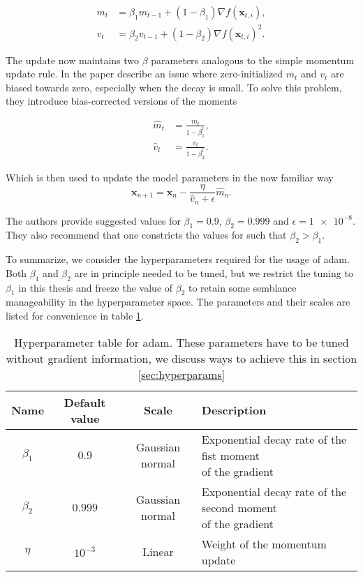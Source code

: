 \begin{align}
m_t &= \beta_1 m_{t-1} +(1-\beta_1)\nabla f(\mathbf{x}_{t, i}), \\
v_t &= \beta_2 v_{t-1} +(1-\beta_2)\nabla f(\mathbf{x}_{t, i})^2.
\end{align}

\noindent The update now maintains two $\beta$ parameters analogous to the simple momentum update rule. In the paper \citet{Kingma2015} describe an issue where zero-initialized $m_t$ and $v_t$ are biased towards zero, especially when the decay is small. To solve this problem, they introduce bias-corrected versions of the moments 

\begin{align}
\hat{m}_t &= \frac{m_t}{1 - \beta_1^t}, \\
\hat{v}_t &= \frac{v_t}{1 - \beta_2^t}.
\end{align}

\noindent Which is then used to update the model parameters in the now familiar way
\begin{equation}\label{eq:adam}
\mathbf{x}_{n+1} = \mathbf{x}_{n} - \frac{\eta}{\hat{v}_n + \epsilon}\hat{m}_n.
\end{equation}

\noindent The authors provide suggested values for $\beta_1 =0.9 $, $\beta_2 =0.999$ and $\epsilon = \num{1e-8}$. They also recommend that one constricts the values for such that $\beta_2 > \beta_1$. 

To summarize, we consider the hyperparameters required for the usage of adam. Both $\beta_1$ and $\beta_2$ are in principle needed to be tuned, but we restrict the tuning to $\beta_1$ in this thesis and freeze the value of $\beta_2$ to retain some semblance manageability in the hyperparameter space. The parameters and their scales are listed for convenience in table \ref{tab:adam}.

\begin{table}
\begin{tabular}{cccl}
\toprule
Name &Default value & Scale  & Description\\
\midrule
$\beta_1$  & $0.9$ & Gaussian normal & \makecell[l]{Exponential decay rate of the fist moment \\ of the gradient}\\
$\beta_2$  & $0.999$ & Gaussian normal & \makecell[l]{Exponential decay rate of the second moment \\ of the gradient}\\
$\eta$  & $10^{-3}$ & Linear & Weight of the momentum update \\
\bottomrule
\end{tabular}
\caption{Hyperparameter table for adam. These parameters have to be tuned without gradient information, we discuss ways to achieve this in section \ref{sec:hyperparams}}\label{tab:adam}
\end{table}

